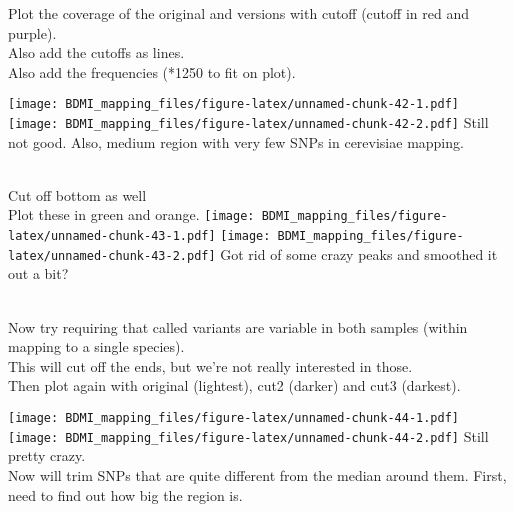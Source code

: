\documentclass[
]{article}
\newenvironment{Shaded}{\begin{snugshade}}{\end{snugshade}}
\newcommand{\DecValTok}[1]{\textcolor[rgb]{0.00,0.00,0.81}{#1}}
\newcommand{\FunctionTok}[1]{\textcolor[rgb]{0.13,0.29,0.53}{\textbf{#1}}}
\newcommand{\NormalTok}[1]{#1}
\newcommand{\OtherTok}[1]{\textcolor[rgb]{0.56,0.35,0.01}{#1}}
\newcommand{\SpecialCharTok}[1]{\textcolor[rgb]{0.81,0.36,0.00}{\textbf{#1}}}
\begin{document}
\begin{Shaded}
\end{Shaded}

Plot the coverage of the original and versions with cutoff (cutoff in
red and purple).\\
Also add the cutoffs as lines.\\
Also add the frequencies (*1250 to fit on plot).

\texttt{[image: BDMI\_mapping\_files/figure-latex/unnamed-chunk-42-1.pdf]}
\texttt{[image: BDMI\_mapping\_files/figure-latex/unnamed-chunk-42-2.pdf]}
Still not good. Also, medium region with very few SNPs in cerevisiae
mapping.\\
\strut \\
Cut off bottom as well\\
Plot these in green and orange.
\texttt{[image: BDMI\_mapping\_files/figure-latex/unnamed-chunk-43-1.pdf]}
\texttt{[image: BDMI\_mapping\_files/figure-latex/unnamed-chunk-43-2.pdf]}
Got rid of some crazy peaks and smoothed it out a bit?\\
\strut \\
Now try requiring that called variants are variable in both samples
(within mapping to a single species).\\
This will cut off the ends, but we're not really interested in those.\\
Then plot again with original (lightest), cut2 (darker) and cut3
(darkest).

\texttt{[image: BDMI\_mapping\_files/figure-latex/unnamed-chunk-44-1.pdf]}
\texttt{[image: BDMI\_mapping\_files/figure-latex/unnamed-chunk-44-2.pdf]}
Still pretty crazy.\\
Now will trim SNPs that are quite different from the median around them.
First, need to find out how big the region is.
\end{document}
